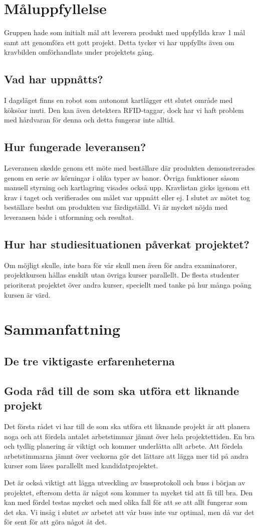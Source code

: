 \documentclass[a4paper,12pt,fleqn]{article}
\begin{document}
\section{Måluppfyllelse}
Gruppen hade som initialt mål att leverera produkt med uppfyllda krav 1 mål samt att genomföra ett gott projekt. Detta tycker vi har uppfyllts även om kravbilden omförhandlats under projektets gång.
\subsection{Vad har uppnåtts?}
I dagsläget finns en robot som autonomt kartlägger ett slutet område med köksöar inuti. Den kan även detektera RFID-taggar, dock har vi haft problem med hårdvaran för denna och detta fungerar inte alltid. 

\subsection{Hur fungerade leveransen?}
Leveransen skedde genom ett möte med beställare där produkten demonstrerades genom en serie av körningar i olika typer av banor. Övriga funktioner såsom manuell styrning och kartlagring visades också upp. Kravlistan gicks igenom ett krav i taget och verifierades om målet var uppnått eller ej. I slutet av mötet tog beställare beslut om produkten var färdigställd. Vi är mycket nöjda med leveransen både i utformning och resultat.
\subsection{Hur har studiesituationen påverkat projektet?}
Om möjligt skulle, inte bara för vår skull men även för andra examinatorer, projektkursen hållas enskilt utan övriga kurser parallellt. De flesta studenter prioriterat projektet över andra kurser, speciellt med tanke på hur många poäng kursen är värd.  

\section{Sammanfattning}
\subsection{De tre viktigaste erfarenheterna}
\subsection{Goda råd till de som ska utföra ett liknande projekt}
Det första rådet vi har till de som ska utföra ett liknande projekt är att planera noga och att fördela antalet arbetstimmar jämnt över hela projektettiden. En bra och tydlig planering är viktigt och kommer underlätta allt arbete. Att fördela arbetstimmarna jämnt över veckorna gör det lättare att lägga mer tid på andra kurser som läses parallellt med kandidatprojektet.

Det är också viktigt att lägga utveckling av bussprotokoll och buss i början av projektet, eftersom detta är något som kommer ta mycket tid att få till bra. Den kan med fördel testas mycket och med olika fall för att se att allt fungerar som det ska. Vi insåg i slutet av arbetet att vår buss inte var optimal, men då var det för sent för att göra något åt det.
\end{document}
